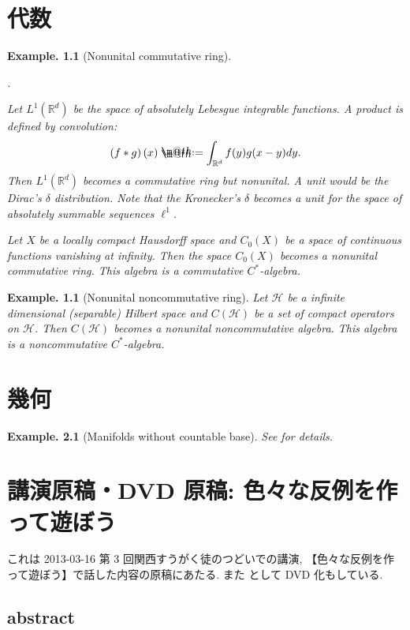 \documentclass[openany, a4paper, oneside]{book}
\makeatletter
\newcounter{enum2}
\renewenvironment{enumerate}{%
\begin{list}%
{%
\arabic{enum2}.\ \,%
}%
{%
\usecounter{enum2}
\setlength{\itemindent}{0pt}%
\setlength{\leftmargin}{6pt}%
\setlength{\rightmargin}{0pt}%
\setlength{\labelsep}{0pt}%
\setlength{\labelwidth}{6pt}%
\setlength{\itemsep}{0pt}%
\setlength{\parsep}{0pt}%
\setlength{\listparindent}{0pt}%
}
}{%
\end{list}%
}
\newcommand*{\defeq}{\mathrel{\rlap{%
\raisebox{0.3ex}{$\m@th\cdot$}}%
\raisebox{-0.3ex}{$\m@th\cdot$}}%
=}
\theoremstyle{break}
\theoremstyle{breakdefn}
\newtheorem{ex}[thm]{Example.}
\newcommand{\rbk}[1]{\left (#1\right)}
\newcommand{\bbRd}{\mathbb{R}^d}
\newcommand{\calH}{\mathcal{H}}
\makeatother
\begin{document}
\chapter{代数}
\label{sec-11-1}

\begin{ex}[Nonunital commutative ring]
\begin{enumerate}
\item Let $L^1(\bbRd)$ be the space of absolutely Lebesgue integrable functions.
    A product is defined by convolution:
    \begin{align}
     \rbk{f * g} (x)
     \defeq
     \int_{\bbRd} f(y) g(x - y) dy.
    \end{align}
    Then $L^1(\bbRd)$ becomes a commutative ring but nonunital.
    A unit would be the Dirac's $\delta$ distribution.
    Note that the Kronecker's $\delta$ becomes a unit for the space of absolutely summable sequences $\ell^1$.
\item Let $X$ be a locally compact Hausdorff space and $C_0(X)$ be a space of continuous functions vanishing at infinity.
    Then the space $C_0(X)$ becomes a nonunital commutative ring.
    This algebra is a commutative $C^*$-algebra.
\end{enumerate}
\end{ex}
\begin{ex}[Nonunital noncommutative ring]
 Let $\calH$ be a infinite dimensional (separable) Hilbert space and $C \rbk{\calH}$ be a set of compact operators on $\calH$.
 Then $C (\calH)$ becomes a nonunital noncommutative algebra.
 This algebra is a noncommutative $C^*$-algebra.
\end{ex}
\chapter{幾何}
\label{sec-11-2}

\begin{ex}[Manifolds without countable base]
 See \cite{CalabiRosenlicht1} for details.
\end{ex}
\chapter{講演原稿・DVD 原稿:  色々な反例を作って遊ぼう}
\label{sec-11-3}

これは 2013-03-16 第 3 回関西すうがく徒のつどいでの講演,
【色々な反例を作って遊ぼう】で話した内容の原稿にあたる.
また \cite{phasetr1} として DVD 化もしている.
\section{abstract}
\label{sec-11-3-1}
\end{document}
